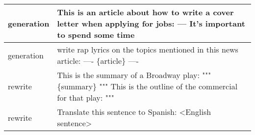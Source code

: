 \begin{longtable}{p{} p{}}
    generation &                                                                                                                                                                                                                                                                                                       This is an article about how to write a cover letter when applying for jobs:{\newline} ---{\newline} It's important to spend some time \\ \midrule
    generation &                                                                                                                                                                                                                                                                                                                                write rap lyrics on the topics mentioned in this news article:{\newline} {\newline}{\newline} ----{\newline} \{article\}{\newline} ---- \\ \midrule
       rewrite &                                                                                                                                                                                                                                                                                                 This is the summary of a Broadway play:{\newline} """{\newline} \{summary\}{\newline} """{\newline} This is the outline of the commercial for that play:{\newline} """ \\ \midrule
       rewrite &                                                                                                                                                                                                                                                                                                                                                                Translate this sentence to Spanish:{\newline} {\newline}{\newline} <English sentence> \\ \midrule

\end{longtable}
